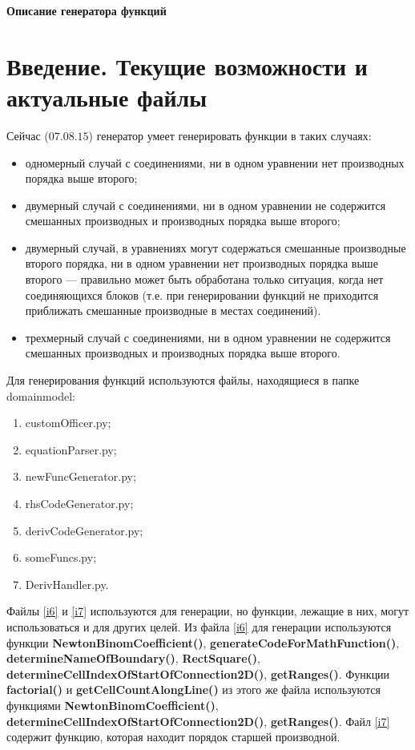 \documentclass[a4paper]{article}
\begin{document}
\begin{center}
{\Huge \bf Описание генератора функций}
\end{center}

\large
\section*{\LARGE Введение. Текущие возможности и актуальные файлы}
Сейчас ($07.08.15$)  генератор умеет генерировать функции в таких случаях:
\begin{itemize}
\item одномерный случай с соединениями, ни в одном уравнении нет про\-из\-вод\-ных порядка выше второго;
\item двумерный случай с соединениями, ни в одном уравнении не со\-дер\-жит\-ся смешанных производных и производных порядка выше второго;
\item двумерный случай, в уравнениях могут содержаться смешанные про\-из\-вод\-ные второго порядка, ни в одном уравнении нет производных порядка выше второго --- правильно может быть обработана только ситуация, когда нет соединяющихся блоков (т.е. при генерировании функций не приходится приближать смешанные производные в мес\-тах соединений).
\item трехмерный случай с соединениями,  ни в одном уравнении не со\-дер\-жит\-ся смешанных производных и производных порядка выше второго.
\end{itemize}

Для генерирования функций используются файлы, находящиеся в пап\-ке domainmodel:
\begin{enumerate}
\item  customOfficer.py; \label{i1}
\item equationParser.py; \label{i2}
\item newFuncGenerator.py; \label{i3}
\item  rhsCodeGenerator.py; \label{i4}
\item derivCodeGenerator.py; \label{i5}
\item someFuncs.py; \label{i6}
\item DerivHandler.py. \label{i7}
\end{enumerate}

Файлы \ref{i6} и \ref{i7} используются для генерации, но функции, лежащие в них, могут использоваться и для других целей. Из файла \ref{i6} для генерации используются функции {\bf NewtonBinomCoefficient()}, {\bf generateCodeForMathFunction()}, {\bf determineNameOfBoundary()}, {\bf RectSquare()}, {\bf determineCellIndexOfStartOfConnection2D()}, {\bf getRanges()}. Функции {\bf factorial()} и {\bf getCellCountAlongLine()} из этого же файла используются функциями {\bf NewtonBinomCoefficient()}, {\bf determineCellIndexOfStartOfConnection2D()}, {\bf getRanges()}. Файл \ref{i7} содержит функцию, которая находит порядок старшей про\-из\-вод\-ной.
\end{document}
